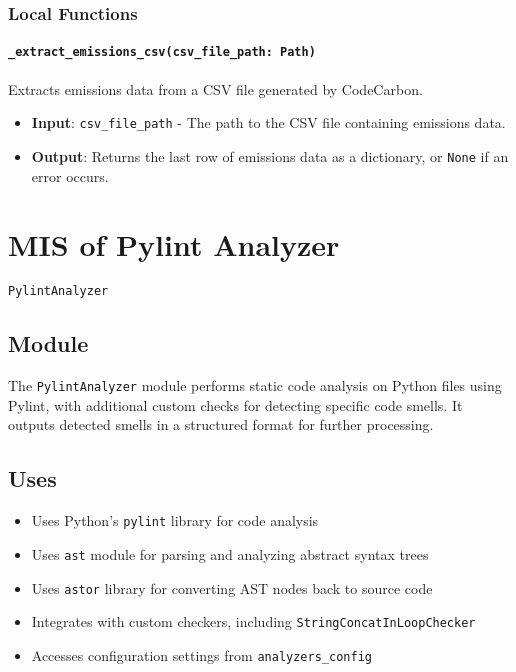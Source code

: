 \documentclass[12pt, titlepage]{article}
\begin{document}
\subsubsection{Local Functions}
\paragraph{\texttt{\_extract\_emissions\_csv(csv\_file\_path: Path)}}
    
    Extracts emissions data from a CSV file generated by CodeCarbon.
    \begin{itemize}
        \item \textbf{Input}: \texttt{csv\_file\_path} - The path to the CSV file containing emissions data.
        \item \textbf{Output}: Returns the last row of emissions data as a dictionary, or \texttt{None} if an error occurs.
    \end{itemize}

  
  
\newpage

\section{MIS of Pylint Analyzer} \label{mis:PylintAnalyzer}

\texttt{PylintAnalyzer}

\subsection{Module}

The \texttt{PylintAnalyzer} module performs static code analysis on Python files using Pylint, with additional custom checks for detecting specific code smells. It outputs detected smells in a structured format for further processing.

\subsection{Uses}
\begin{itemize}
  \item Uses Python's \texttt{pylint} library for code analysis
  \item Uses \texttt{ast} module for parsing and analyzing abstract syntax trees
  \item Uses \texttt{astor} library for converting AST nodes back to source code
  \item Integrates with custom checkers, including \texttt{StringConcatInLoopChecker}
  \item Accesses configuration settings from \texttt{analyzers\_config}
\end{itemize}
\end{document}
